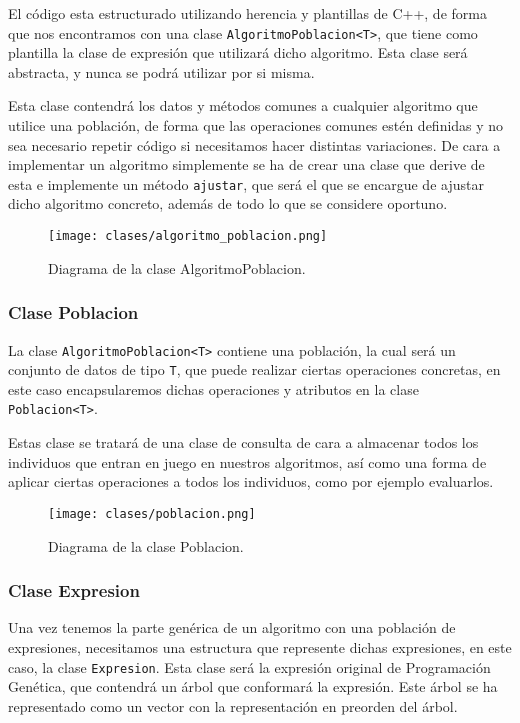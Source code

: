 El código esta estructurado utilizando herencia y plantillas de C++, de forma que nos encontramos con una clase \texttt{AlgoritmoPoblacion<T>}, que tiene como plantilla la clase de expresión que utilizará dicho algoritmo. Esta clase será abstracta, y nunca se podrá utilizar por si misma.

Esta clase contendrá los datos y métodos comunes a cualquier algoritmo que utilice una población, de forma que las operaciones comunes estén definidas y no sea necesario repetir código si necesitamos hacer distintas variaciones. De cara a implementar un algoritmo simplemente se ha de crear una clase que derive de esta e implemente un método \texttt{ajustar}, que será el que se encargue de ajustar dicho algoritmo concreto, además de todo lo que se considere oportuno.

\begin{figure}[H]
	 \centering
	 \texttt{[image: clases/algoritmo\_poblacion.png]}
	 \caption{Diagrama de la clase AlgoritmoPoblacion.}
	\label{fig:diagrama_clase_algoritmo_poblacion}
\end{figure}


\subsubsection{Clase Poblacion}

La clase \texttt{AlgoritmoPoblacion<T>} contiene una población, la cual será un conjunto de datos de tipo \texttt{T}, que puede realizar ciertas operaciones concretas, en este caso encapsularemos dichas operaciones y atributos en la clase \texttt{Poblacion<T>}.

Estas clase se tratará de una clase de consulta de cara a almacenar todos los individuos que entran en juego en nuestros algoritmos, así como una forma de aplicar ciertas operaciones a todos los individuos, como por ejemplo evaluarlos.

\begin{figure}[H]
	 \centering
	 \texttt{[image: clases/poblacion.png]}
	 \caption{Diagrama de la clase Poblacion.}
	\label{fig:diagrama_clase_poblacion}
\end{figure}

\newpage

\subsubsection{Clase Expresion}

Una vez tenemos la parte genérica de un algoritmo con una población de expresiones, necesitamos una estructura que represente dichas expresiones, en este caso, la clase \texttt{Expresion}. Esta clase será la expresión original de Programación Genética, que contendrá un árbol que conformará la expresión. Este árbol se ha representado como un vector con la representación en preorden del árbol.

